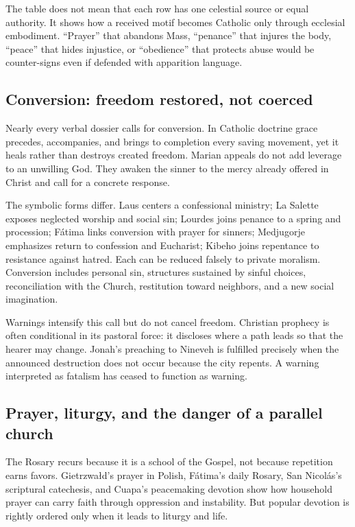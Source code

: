 The table does not mean that each row has one celestial source or equal authority. It shows how a received motif becomes Catholic only through ecclesial embodiment. ``Prayer'' that abandons Mass, ``penance'' that injures the body, ``peace'' that hides injustice, or ``obedience'' that protects abuse would be counter-signs even if defended with apparition language.

\subsection{Conversion: freedom restored, not coerced}

Nearly every verbal dossier calls for conversion. In Catholic doctrine grace precedes, accompanies, and brings to completion every saving movement, yet it heals rather than destroys created freedom. Marian appeals do not add leverage to an unwilling God. They awaken the sinner to the mercy already offered in Christ and call for a concrete response.

The symbolic forms differ. Laus centers a confessional ministry; La Salette exposes neglected worship and social sin; Lourdes joins penance to a spring and procession; Fátima links conversion with prayer for sinners; Medjugorje emphasizes return to confession and Eucharist; Kibeho joins repentance to resistance against hatred. Each can be reduced falsely to private moralism. Conversion includes personal sin, structures sustained by sinful choices, reconciliation with the Church, restitution toward neighbors, and a new social imagination.

Warnings intensify this call but do not cancel freedom. Christian prophecy is often conditional in its pastoral force: it discloses where a path leads so that the hearer may change. Jonah's preaching to Nineveh is fulfilled precisely when the announced destruction does not occur because the city repents. A warning interpreted as fatalism has ceased to function as warning.

\subsection{Prayer, liturgy, and the danger of a parallel church}

The Rosary recurs because it is a school of the Gospel, not because repetition earns favors. Gietrzwałd's prayer in Polish, Fátima's daily Rosary, San Nicolás's scriptural catechesis, and Cuapa's peacemaking devotion show how household prayer can carry faith through oppression and instability. But popular devotion is rightly ordered only when it leads to liturgy and life.


